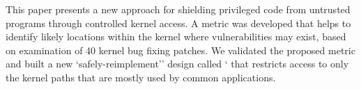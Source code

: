 


This paper presents a new approach for shielding privileged code from untrusted
programs through controlled kernel access.
A metric was developed that helps to identify likely locations
within the kernel where vulnerabilities may exist, based on examination of
40 kernel bug fixing patches. We validated the proposed metric and built a new
`safely-reimplement'' design %
called ` that restricts access to only the
kernel paths that are mostly used by common applications.


